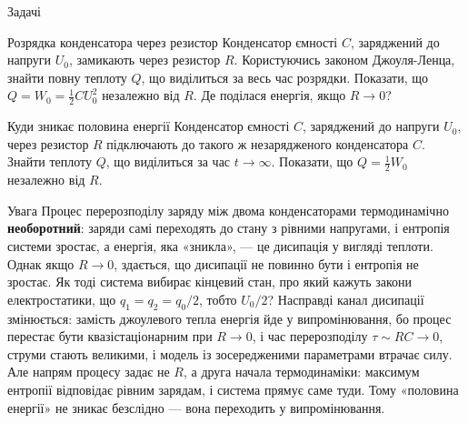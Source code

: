 \documentclass[onlytextwidth]{beamer}
\begin{document}
\begin{frame}[t]{Задачі}{}
	\begin{exampleblock}{Розрядка конденсатора через резистор}
		Конденсатор ємності $C$, заряджений до напруги $U_0$, замикають через
		резистор $R$. Користуючись законом Джоуля-Ленца, знайти
		повну теплоту $Q$, що виділиться за весь час розрядки. Показати, що
		$Q = W_0 = \frac{1}{2} C U_0^2$ незалежно від $R$. Де поділася енергія,
		якщо $R \to 0$?
	\end{exampleblock}


	\begin{exampleblock}{Куди зникає половина енергії}
		Конденсатор ємності $C$, заряджений до напруги $U_0$, через резистор $R$
		підключають до такого ж незарядженого конденсатора $C$.
		Знайти теплоту $Q$, що виділиться за час $t \to \infty$.
		Показати, що $Q = \frac{1}{2} W_0$ незалежно від $R$.

	\end{exampleblock}


	\begin{block}{Увага}\scriptsize\justifying
		Процес перерозподілу заряду між двома конденсаторами термодинамічно
		\textbf{необоротний}: заряди самі переходять до стану з рівними напругами, і
		ентропія системи зростає, а енергія, яка «зникла», --- це дисипація у вигляді
		теплоти. Однак якщо $R \to 0$, здається, що дисипації не повинно бути і
		ентропія не зростає. Як тоді система вибирає кінцевий стан, про який кажуть
		закони електростатики, що $q_1 = q_2 = q_0/2$, тобто $U_0/2$? Насправді канал
		дисипації змінюється: замість джоулевого тепла енергія йде у випромінювання, бо
		процес перестає бути квазістаціонарним при $R \to 0$, і час перерозподілу
		$\tau \sim RC \to 0$, струми стають великими, і модель із зосередженими
		параметрами втрачає силу. Але напрям процесу задає не $R$, а друга начала
		термодинаміки: максимум ентропії відповідає рівним зарядам, і система
		прямує саме туди. Тому «половина енергії» не зникає безслідно --- вона
		переходить у випромінювання.
	\end{block}


\end{frame}
\end{document}
